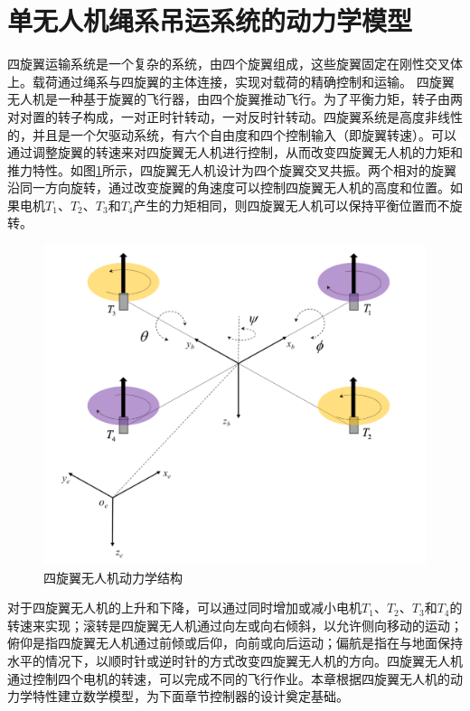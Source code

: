 \documentclass[lang=chs, degree=master, blindreview=true, winfonts=true]{yanputhesis}
\begin{document}
\section{单无人机绳系吊运系统的动力学模型}
四旋翼运输系统是一个复杂的系统，由四个旋翼组成，这些旋翼固定在刚性交叉体上。载荷通过绳系与四旋翼的主体连接，实现对载荷的精确控制和运输。
四旋翼无人机是一种基于旋翼的飞行器，由四个旋翼推动飞行。为了平衡力矩，转子由两对对置的转子构成，一对正时针转动，一对反时针转动。四旋翼系统是高度非线性的，并且是一个欠驱动系统，有六个自由度和四个控制输入（即旋翼转速）。可以通过调整旋翼的转速来对四旋翼无人机进行控制，从而改变四旋翼无人机的力矩和推力特性。如图\ref{2_1}所示，四旋翼无人机设计为四个旋翼交叉共振。两个相对的旋翼沿同一方向旋转，通过改变旋翼的角速度可以控制四旋翼无人机的高度和位置。如果电机$T_1$、$T_2$、$T_3$和$T_4$产生的力矩相同，则四旋翼无人机可以保持平衡位置而不旋转。

\begin{figure}[hbt!]
	\centering
	\includegraphics[width=28pc]{picture/2_1.png} 
	\caption{四旋翼无人机动力学结构} \label{2_1}
\end{figure}


对于四旋翼无人机的上升和下降，可以通过同时增加或减小电机$T_1$、$T_2$、$T_3$和$T_4$的转速来实现；滚转是四旋翼无人机通过向左或向右倾斜，以允许侧向移动的运动；俯仰是指四旋翼无人机通过前倾或后仰，向前或向后运动；偏航是指在与地面保持水平的情况下，以顺时针或逆时针的方式改变四旋翼无人机的方向。四旋翼无人机通过控制四个电机的转速，可以完成不同的飞行作业。本章根据四旋翼无人机的动力学特性建立数学模型，为下面章节控制器的设计奠定基础。
\end{document}

